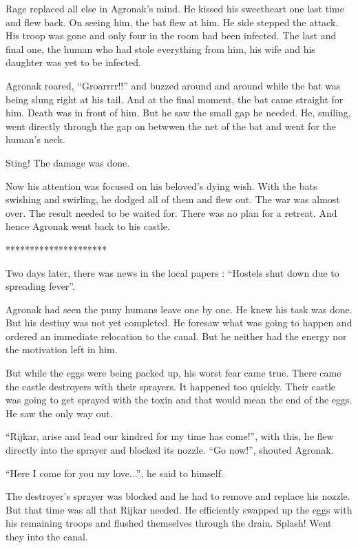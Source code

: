 \documentclass[twoside,11pt]{article}
\begin{document}
Rage replaced all else in Agronak's mind. He kissed his sweetheart one last time and flew back. On seeing him, the bat flew at him. He side stepped the attack. His troop was gone and only four in the room had been infected. The last and final one, the human who had stole everything from him, his wife and his daughter was yet to be infected.

Agronak roared, ``Groarrrr!!'' and buzzed around and around while the bat was being slung right at his tail. And at the final moment, the bat came straight for him. Death was in front of him. But he saw the small gap he needed. He, smiling, went directly through the gap on betwwen the net of the bat and went for the human’s neck.

Sting! The damage was done.

Now his attention was focused on his beloved's dying wish. With the bats swishing and swirling, he dodged all of them and flew out. The war was almost over. The result needed to be waited for. There was no plan for a retreat. And hence Agronak went back to his castle.

\bigskip
\begin{center}
*********************
\end{center}


Two days later, there was news in the local papers : ``Hostels shut down due to spreading fever''.

Agronak had seen the puny humans leave one by one. He knew his task was done. But his destiny was not yet completed. He foresaw what was going to happen and ordered an immediate relocation to the canal. But he neither had the energy nor the motivation left in him.

But while the eggs were being packed up, his worst fear came true. There came the castle destroyers with their sprayers. It happened too quickly. Their castle was going to get sprayed with the toxin and that would mean the end of the eggs. He saw the only way out.

``Rijkar, arise and lead our kindred for my time has come!'', with this, he flew directly into the sprayer and blocked its nozzle. ``Go now!'', shouted Agronak.

``Here I come for you my love...'', he said to himself.

The destroyer's sprayer was blocked and he had to remove and replace his nozzle. But that time was all that Rijkar needed. He efficiently swapped up the eggs with his remaining troops and flushed themselves through the drain. Splash! Went they into the canal.
\end{document}

